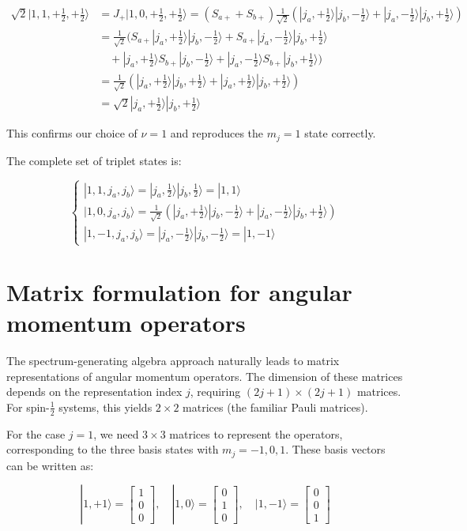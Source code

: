 \begin{align}
\sqrt{2}|1,1,+\frac{1}{2},+\frac{1}{2}\rangle &= J_{+}|1,0,+\frac{1}{2},+\frac{1}{2}\rangle=(S_{a+}+S_{b+})\frac{1}{\sqrt{2}}(|j_a,+\frac{1}{2}\rangle|j_b,-\frac{1}{2}\rangle+|j_a,-\frac{1}{2}\rangle|j_b,+\frac{1}{2}\rangle) \\
&= \frac{1}{\sqrt{2}}(S_{a+}|j_a,+\frac{1}{2}\rangle|j_b,-\frac{1}{2}\rangle+S_{a+}|j_a,-\frac{1}{2}\rangle|j_b,+\frac{1}{2}\rangle \\
&\quad +|j_a,+\frac{1}{2}\rangle S_{b+}|j_b,-\frac{1}{2}\rangle+|j_a,-\frac{1}{2}\rangle S_{b+}|j_b,+\frac{1}{2}\rangle) \\
&= \frac{1}{\sqrt{2}}(|j_a,+\frac{1}{2}\rangle|j_b,+\frac{1}{2}\rangle+|j_a,+\frac{1}{2}\rangle|j_b,+\frac{1}{2}\rangle) \\
&= \sqrt{2}|j_a,+\frac{1}{2}\rangle|j_b,+\frac{1}{2}\rangle
\end{align}

This confirms our choice of $\nu=1$ and reproduces the $m_j=1$ state correctly.

The complete set of triplet states is:

\[
\left\{\begin{array}{l}
|1,1,j_a,j_b\rangle=|j_a,\frac{1}{2}\rangle|j_b,\frac{1}{2}\rangle=|1,1\rangle  \\
|1,0,j_a,j_b\rangle=\frac{1}{\sqrt{2}}(|j_a,+\frac{1}{2}\rangle|j_b,-\frac{1}{2}\rangle+|j_a,-\frac{1}{2}\rangle|j_b,+\frac{1}{2}\rangle) \\
|1,-1,j_a,j_b\rangle=|j_a,-\frac{1}{2}\rangle|j_b,-\frac{1}{2}\rangle=|1,-1\rangle
\end{array}\right.
\]


\section{Matrix formulation for angular momentum operators}
The spectrum-generating algebra approach naturally leads to matrix representations of angular momentum operators. The dimension of these matrices depends on the representation index $j$, requiring $(2j+1)\times(2j+1)$ matrices. For spin-$\frac{1}{2}$ systems, this yields $2\times2$ matrices (the familiar Pauli matrices).

For the case $j=1$, we need $3\times3$ matrices to represent the operators, corresponding to the three basis states with $m_j=-1,0,1$. These basis vectors can be written as:

\[
|1,+1\rangle=\left[\begin{array}{l}
1  \\
0 \\
0
\end{array}\right], \quad|1,0\rangle=\left[\begin{array}{l}
0 \\
1 \\
0
\end{array}\right], \quad|1,-1\rangle=\left[\begin{array}{l}
0 \\
0 \\
1
\end{array}\right]
\]

